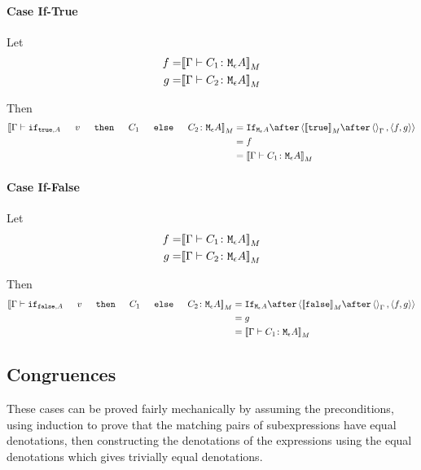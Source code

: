\documentclass{report}
\begin{document}



    \paragraph{Case If-True}
    Let
    \begin{align}
        f = &{\bf [\![}\Gamma \vdash C_1 \colon \texttt{M}_{\epsilon}{A}{\bf ]\!]}_M\\
        g = &{\bf [\![}\Gamma \vdash C_2 \colon \texttt{M}_{\epsilon}{A}{\bf ]\!]}_M\\
    \end{align}

    Then
    \begin{equation}
        \begin{split}
            \deno{\gtyperelation{\ifthenelse{\t}{A}{v}{C_1}{C_2}}{\mea}} & = \ifnt{\mea}\after \pr{\deno{\t}\after\term{\G}}{\pr{f}{g}} \\
            & = f\\
            & = \deno{\gtyperelation{C_1}{\mea}}\\
        \end{split}
    \end{equation}

    \paragraph{Case If-False}
    Let
    \begin{align}
        f = &{\bf [\![}\Gamma \vdash C_1 \colon \texttt{M}_{\epsilon}{A}{\bf ]\!]}_M\\
        g = &{\bf [\![}\Gamma \vdash C_2 \colon \texttt{M}_{\epsilon}{A}{\bf ]\!]}_M\\
    \end{align}

    Then
    \begin{equation}
        \begin{split}
            \deno{\gtyperelation{\ifthenelse{\f}{A}{v}{C_1}{C_2}}{\mea}} & = \ifnt{\mea}\after \pr{\deno{\f}\after\term{\G}}{\pr{f}{g}} \\
            & = g\\
            & = \deno{\gtyperelation{C_1}{\mea}}\\
        \end{split}
    \end{equation}



    \subsection{Congruences}
    These cases can be proved fairly mechanically by assuming the preconditions, using induction to prove that the matching pairs of subexpressions have equal denotations, then constructing the denotations of the expressions using the equal denotations which gives trivially equal denotations.
\end{document}
